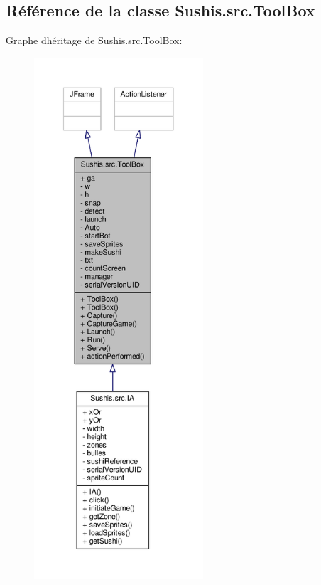 \hypertarget{classSushis_1_1src_1_1ToolBox}{}\subsection{Référence de la classe Sushis.\+src.\+Tool\+Box}
\label{classSushis_1_1src_1_1ToolBox}


Graphe d\textquotesingle{}héritage de Sushis.\+src.\+Tool\+Box\+:\nopagebreak
\begin{figure}[H]
\begin{center}
\leavevmode
\includegraphics[height=550pt]{classSushis_1_1src_1_1ToolBox__inherit__graph}
\end{center}
\end{figure}


